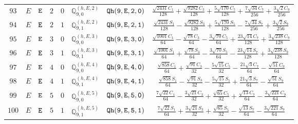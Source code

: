 \documentclass[fleqn,8pt]{jsarticle}
\begin{document}
\begin{table}[ht!]
\begin{center}
\begin{tabular}{cccccccc}
$ 93 $ & $ E $ & $ {\tt E} $ & $ 2 $ & $ 0 $ & $ \mathbb{Q}_{9,0}^{(h,E,2)} $ & $ {\tt Qh(9,E,2,0)} $ & $ \frac{\sqrt{2431} C_{1}}{128} + \frac{\sqrt{9282} C_{3}}{128} + \frac{5 \sqrt{170} C_{5}}{128} + \frac{7 \sqrt{34} C_{7}}{256} + \frac{3 \sqrt{2} C_{9}}{256} $ \\
$ 94 $ & $ E $ & $ {\tt E} $ & $ 2 $ & $ 1 $ & $ \mathbb{Q}_{9,1}^{(h,E,2)} $ & $ {\tt Qh(9,E,2,1)} $ & $ \frac{\sqrt{2431} S_{1}}{128} - \frac{\sqrt{9282} S_{3}}{128} + \frac{5 \sqrt{170} S_{5}}{128} - \frac{7 \sqrt{34} S_{7}}{256} + \frac{3 \sqrt{2} S_{9}}{256} $ \\
$ 95 $ & $ E $ & $ {\tt E} $ & $ 3 $ & $ 0 $ & $ \mathbb{Q}_{9,0}^{(h,E,3)} $ & $ {\tt Qh(9,E,3,0)} $ & $ \frac{\sqrt{1001} C_{1}}{64} - \frac{\sqrt{78} C_{3}}{64} - \frac{3 \sqrt{70} C_{5}}{64} + \frac{23 \sqrt{14} C_{7}}{128} + \frac{3 \sqrt{238} C_{9}}{128} $ \\
$ 96 $ & $ E $ & $ {\tt E} $ & $ 3 $ & $ 1 $ & $ \mathbb{Q}_{9,1}^{(h,E,3)} $ & $ {\tt Qh(9,E,3,1)} $ & $ \frac{\sqrt{1001} S_{1}}{64} + \frac{\sqrt{78} S_{3}}{64} - \frac{3 \sqrt{70} S_{5}}{64} - \frac{23 \sqrt{14} S_{7}}{128} + \frac{3 \sqrt{238} S_{9}}{128} $ \\
$ 97 $ & $ E $ & $ {\tt E} $ & $ 4 $ & $ 0 $ & $ \mathbb{Q}_{9,0}^{(h,E,4)} $ & $ {\tt Qh(9,E,4,0)} $ & $ \frac{\sqrt{858} C_{1}}{64} + \frac{\sqrt{91} C_{3}}{32} - \frac{5 \sqrt{15} C_{5}}{32} - \frac{21 \sqrt{3} C_{7}}{64} - \frac{\sqrt{51} C_{9}}{64} $ \\
$ 98 $ & $ E $ & $ {\tt E} $ & $ 4 $ & $ 1 $ & $ \mathbb{Q}_{9,1}^{(h,E,4)} $ & $ {\tt Qh(9,E,4,1)} $ & $ \frac{\sqrt{858} S_{1}}{64} - \frac{\sqrt{91} S_{3}}{32} - \frac{5 \sqrt{15} S_{5}}{32} + \frac{21 \sqrt{3} S_{7}}{64} - \frac{\sqrt{51} S_{9}}{64} $ \\
$ 99 $ & $ E $ & $ {\tt E} $ & $ 5 $ & $ 0 $ & $ \mathbb{Q}_{9,0}^{(h,E,5)} $ & $ {\tt Qh(9,E,5,0)} $ & $ \frac{7 \sqrt{22} C_{1}}{64} - \frac{3 \sqrt{21} C_{3}}{32} + \frac{\sqrt{65} C_{5}}{32} + \frac{\sqrt{13} C_{7}}{64} - \frac{3 \sqrt{221} C_{9}}{64} $ \\
$ 100 $ & $ E $ & $ {\tt E} $ & $ 5 $ & $ 1 $ & $ \mathbb{Q}_{9,1}^{(h,E,5)} $ & $ {\tt Qh(9,E,5,1)} $ & $ \frac{7 \sqrt{22} S_{1}}{64} + \frac{3 \sqrt{21} S_{3}}{32} + \frac{\sqrt{65} S_{5}}{32} - \frac{\sqrt{13} S_{7}}{64} - \frac{3 \sqrt{221} S_{9}}{64} $ \\
 \hline \hline
\end{tabular}
\end{center}
\end{table}
\end{document}
